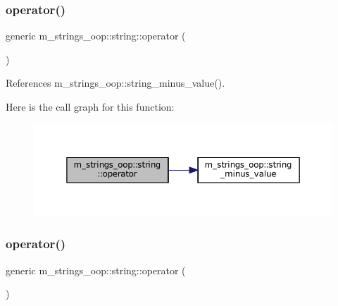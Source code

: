 \subsubsection{\texorpdfstring{operator()}{operator()}\hspace{0.1cm}{\footnotesize\ttfamily [8/10]}}
{\footnotesize\ttfamily generic m\+\_\+strings\+\_\+oop\+::string\+::operator (\begin{DoxyParamCaption}{ }\end{DoxyParamCaption})\hspace{0.3cm}{\ttfamily [private]}}



References m\+\_\+strings\+\_\+oop\+::string\+\_\+minus\+\_\+value().

Here is the call graph for this function\+:\nopagebreak
\begin{figure}[H]
\begin{center}
\leavevmode
\includegraphics[width=350pt]{structm__strings__oop_1_1string_a4e78105db2bb68c2783dae2e9242030d_cgraph}
\end{center}
\end{figure}
\mbox{\label{structm__strings__oop_1_1string_af7cc8956f9ca20d06617dac98ceb15dd}} 
\subsubsection{\texorpdfstring{operator()}{operator()}\hspace{0.1cm}{\footnotesize\ttfamily [9/10]}}
{\footnotesize\ttfamily generic m\+\_\+strings\+\_\+oop\+::string\+::operator (\begin{DoxyParamCaption}{ }\end{DoxyParamCaption})\hspace{0.3cm}{\ttfamily [private]}}



